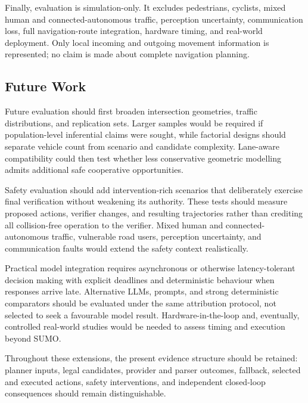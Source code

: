 \documentclass[letterpaper,10pt,conference]{ieeeconf}
\begin{document}
Finally, evaluation is simulation-only. It excludes pedestrians, cyclists, mixed human and connected-autonomous traffic, perception uncertainty, communication loss, full navigation-route integration, hardware timing, and real-world deployment. Only local incoming and outgoing movement information is represented; no claim is made about complete navigation planning.



\subsection{Future Work}



Future evaluation should first broaden intersection geometries, traffic distributions, and replication sets. Larger samples would be required if population-level inferential claims were sought, while factorial designs should separate vehicle count from scenario and candidate complexity. Lane-aware compatibility could then test whether less conservative geometric modelling admits additional safe cooperative opportunities.



Safety evaluation should add intervention-rich scenarios that deliberately exercise final verification without weakening its authority. These tests should measure proposed actions, verifier changes, and resulting trajectories rather than crediting all collision-free operation to the verifier. Mixed human and connected-autonomous traffic, vulnerable road users, perception uncertainty, and communication faults would extend the safety context realistically.



Practical model integration requires asynchronous or otherwise latency-tolerant decision making with explicit deadlines and deterministic behaviour when responses arrive late. Alternative LLMs, prompts, and strong deterministic comparators should be evaluated under the same attribution protocol, not selected to seek a favourable model result. Hardware-in-the-loop and, eventually, controlled real-world studies would be needed to assess timing and execution beyond SUMO.



Throughout these extensions, the present evidence structure should be retained: planner inputs, legal candidates, provider and parser outcomes, fallback, selected and executed actions, safety interventions, and independent closed-loop consequences should remain distinguishable.
\end{document}
